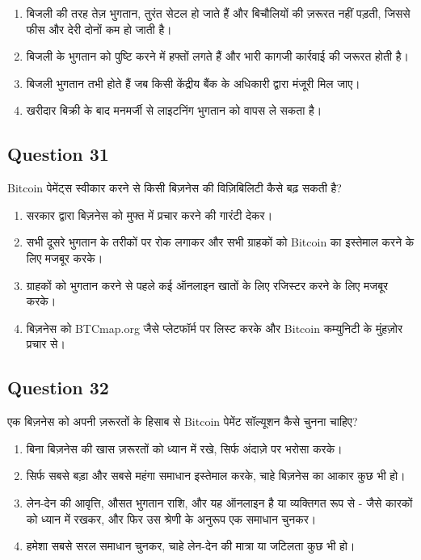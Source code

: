 \documentclass[12pt,a4paper]{article}
\begin{document}
\begin{enumerate}[label=\Alph*., leftmargin=*]
\item बिजली की तरह तेज़ भुगतान, तुरंत सेटल हो जाते हैं और बिचौलियों की ज़रूरत नहीं पड़ती, जिससे फीस और देरी दोनों कम हो जाती है।
\item बिजली के भुगतान को पुष्टि करने में हफ्तों लगते हैं और भारी कागजी कार्रवाई की जरूरत होती है।
\item बिजली भुगतान तभी होते हैं जब किसी केंद्रीय बैंक के अधिकारी द्वारा मंजूरी मिल जाए।
\item खरीदार बिक्री के बाद मनमर्जी से लाइटनिंग भुगतान को वापस ले सकता है।
\end{enumerate}

\bigskip


\subsection*{Question 31}
Bitcoin पेमेंट्स स्वीकार करने से किसी बिज़नेस की विज़िबिलिटी कैसे बढ़ सकती है?

\begin{enumerate}[label=\Alph*., leftmargin=*]
\item सरकार द्वारा बिज़नेस को मुफ्त में प्रचार करने की गारंटी देकर।
\item सभी दूसरे भुगतान के तरीकों पर रोक लगाकर और सभी ग्राहकों को Bitcoin का इस्तेमाल करने के लिए मजबूर करके।
\item ग्राहकों को भुगतान करने से पहले कई ऑनलाइन खातों के लिए रजिस्टर करने के लिए मजबूर करके।
\item बिज़नेस को BTCmap.org जैसे प्लेटफॉर्म पर लिस्ट करके और Bitcoin कम्युनिटी के मुंहज़ोर प्रचार से।
\end{enumerate}

\bigskip


\subsection*{Question 32}
एक बिज़नेस को अपनी ज़रूरतों के हिसाब से Bitcoin पेमेंट सॉल्यूशन कैसे चुनना चाहिए?

\begin{enumerate}[label=\Alph*., leftmargin=*]
\item बिना बिज़नेस की खास ज़रूरतों को ध्यान में रखे, सिर्फ अंदाज़े पर भरोसा करके।
\item सिर्फ सबसे बड़ा और सबसे महंगा समाधान इस्तेमाल करके, चाहे बिज़नेस का आकार कुछ भी हो।
\item लेन-देन की आवृत्ति, औसत भुगतान राशि, और यह ऑनलाइन है या व्यक्तिगत रूप से - जैसे कारकों को ध्यान में रखकर, और फिर उस श्रेणी के अनुरूप एक समाधान चुनकर।
\item हमेशा सबसे सरल समाधान चुनकर, चाहे लेन-देन की मात्रा या जटिलता कुछ भी हो।
\end{enumerate}
\end{document}
